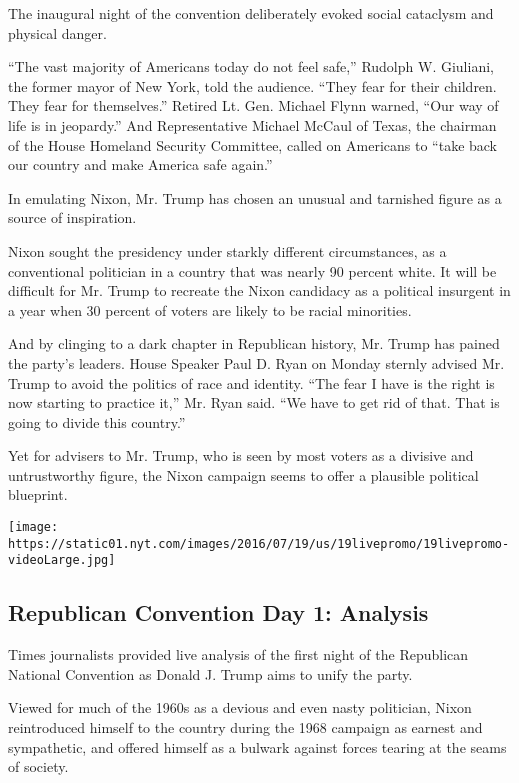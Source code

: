 The inaugural night of the convention deliberately evoked social
cataclysm and physical danger.

``The vast majority of Americans today do not feel safe,'' Rudolph W.
Giuliani, the former mayor of New York, told the audience. ``They fear
for their children. They fear for themselves.'' Retired Lt. Gen. Michael
Flynn warned, ``Our way of life is in jeopardy.'' And Representative
Michael McCaul of Texas, the chairman of the House Homeland Security
Committee, called on Americans to ``take back our country and make
America safe again.''

In emulating Nixon, Mr. Trump has chosen an unusual and tarnished figure
as a source of inspiration.

Nixon sought the presidency under starkly different circumstances, as a
conventional politician in a country that was nearly 90 percent white.
It will be difficult for Mr. Trump to recreate the Nixon candidacy as a
political insurgent in a year when 30 percent of voters are likely to be
racial minorities.

And by clinging to a dark chapter in Republican history, Mr. Trump has
pained the party's leaders. House Speaker Paul D. Ryan on Monday sternly
advised Mr. Trump to avoid the politics of race and identity. ``The fear
I have is the right is now starting to practice it,'' Mr. Ryan said.
``We have to get rid of that. That is going to divide this country.''

Yet for advisers to Mr. Trump, who is seen by most voters as a divisive
and untrustworthy figure, the Nixon campaign seems to offer a plausible
political blueprint.

\href{https://www.nytimes.com/interactive/2016/07/18/us/elections/gop-conventions-speakers.html}{}

\texttt{[image: https://static01.nyt.com/images/2016/07/19/us/19livepromo/19livepromo-videoLarge.jpg]}

\hypertarget{republican-convention-day-1-analysis}{%
\subsection{Republican Convention Day 1:
Analysis}\label{republican-convention-day-1-analysis}}

Times journalists provided live analysis of the first night of the
Republican National Convention as Donald J. Trump aims to unify the
party.

Viewed for much of the 1960s as a devious and even nasty politician,
Nixon reintroduced himself to the country during the 1968 campaign as
earnest and sympathetic, and offered himself as a bulwark against forces
tearing at the seams of society.

